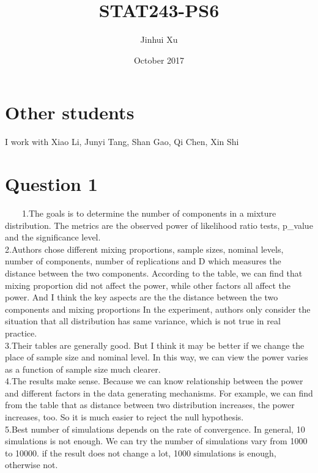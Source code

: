 \documentclass{article}\usepackage[]{graphicx}\usepackage[]{color}
\begin{document}
 
\title{STAT243-PS6}
\author{Jinhui Xu}
\date{October 2017}

\maketitle

\section{Other students}
I work with Xiao Li, Junyi Tang, Shan Gao, Qi Chen, Xin Shi

\section{Question 1}
\ \ \ \ 1.The goals is to determine the number of components in a mixture distribution.
  The metrics are the observed power of likelihood ratio tests, p\_value and the significance level.\\

2.Authors chose different mixing proportions, sample sizes, nominal levels, number of components, number of replications and D which measures the distance between the two components.
  According to the table, we can find that mixing proportion did not affect the power, while other factors all affect the power. And I think the key aspects are the the distance between the two components and mixing proportions
  In the experiment, authors only consider the situation that all distribution has same variance, which is not true in real practice.\\
  
3.Their tables are generally good. But I think it may be better if we change the place of sample size and nominal level. In this way, we can view the power varies as a function of sample size much clearer.\\

4.The results make sense. Because we can know relationship between the power and different  factors in the data generating mechanisms.
  For example, we can find from the table that as distance between two distribution increases, the power increases, too. So it is much easier to reject the null hypothesis.\\
  
5.Best number of simulations depends on the rate of convergence. In general, 10 simulations is not enough. We can try the number of simulations vary from 1000 to 10000. if the result does not change a lot, 1000 simulations is enough, otherwise not.
\end{document}
